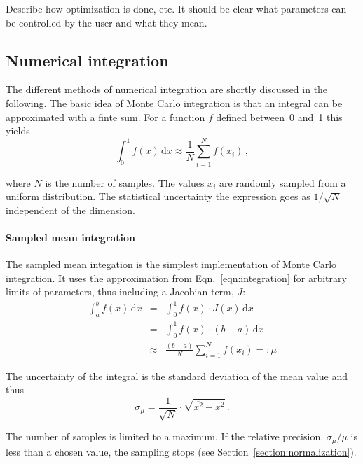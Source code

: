 \documentclass[11pt, a4paper]{article}
\begin{document}
Describe how optimization is done, etc. It should be clear what
parameters can be controlled by the user and what they mean.


\subsection{Numerical integration} 
\label{section:integration} 

The different methods of numerical integration are shortly discussed
in the following. The basic idea of Monte Carlo integration is that an
integral can be approximated with a finte sum. For a function $f$
defined between~0 and~1 this yields 
% 
\begin{equation}
\int_{0}^{1} f(x) \, \mathrm{d}x \approx \frac{1}{N} \sum_{i=1}^{N} f(x_{i}) \, , 
\label{eqn:integration}
\end{equation} 

\noindent 
where $N$ is the number of samples. The values $x_{i}$ are randomly
sampled from a uniform distribution. The statistical uncertainty the
expression goes as $1/\sqrt{N}$ independent of the dimension. 

\paragraph{Sampled mean integration} 

The sampled mean integation is the simplest implementation of Monte
Carlo integration. It uses the approximation from
Eqn.~\ref{eqn:integration} for arbitrary limits of parameters, thus
including a Jacobian term, $J$:
%
\begin{eqnarray}
\int_{a}^{b} f(x) \, \mathrm{d}x & = & \int_{0}^{1} f(x) \cdot J(x) \, \mathrm{d}x \\ 
                                 & = & \int_{0}^{1} f(x) \cdot (b - a) \, \mathrm{d}x \\ 
				 & \approx & \frac{(b - a)}{N} \sum_{i=1}^{N} f(x_{i}) =: \mu
\end{eqnarray} 

\noindent 
The uncertainty of the integral is the standard deviation of the mean
value and thus 
%
\begin{equation}
\sigma_{\mu} = \frac{1}{\sqrt{N}} \cdot \sqrt{\overline{x^{2}} - \overline{x}^{2}} \, . 
\end{equation} 

\noindent 
The number of samples is limited to a maximum. If the relative
precision, $\sigma_{\mu}/\mu$ is less than a chosen value, the
sampling stops (see Section~\ref{section:normalization}). 
\end{document}
